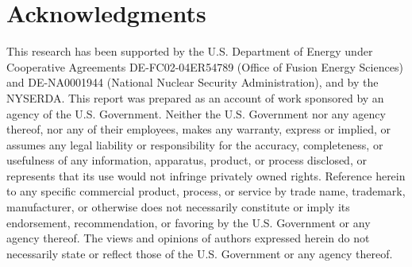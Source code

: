 \documentclass[aip,reprint]{revtex4-1}
\begin{document}
\section{Acknowledgments}
\label{acknowledgments}
%
%
 This research has been supported by the U.S. Department of Energy under Cooperative Agreements DE-FC02-04ER54789 (Office of Fusion Energy Sciences) and DE-NA0001944 (National Nuclear Security Administration), and by the NYSERDA. This report was prepared as an account of work sponsored by an agency of the U.S. Government. Neither the U.S. Government nor any agency thereof, nor any of their employees, makes any warranty, express or implied, or assumes any legal liability or responsibility for the accuracy, completeness, or usefulness of any information, apparatus, product, or process disclosed, or represents that its use would not infringe privately owned rights. Reference herein to any specific commercial product, process, or service by trade name, trademark, manufacturer, or otherwise does not necessarily constitute or imply its endorsement, recommendation, or favoring by the U.S. Government or any agency thereof. The views and opinions of authors expressed herein do not necessarily state or reflect those of the U.S. Government or any agency thereof.
%
%
%
\end{document}
